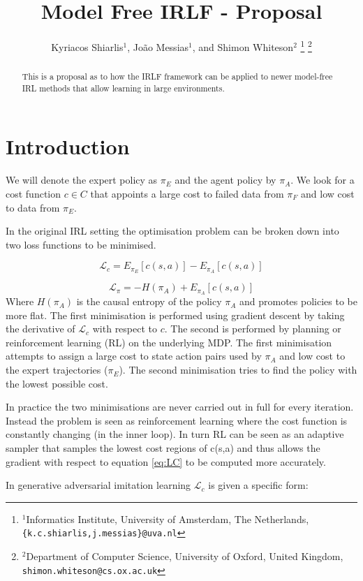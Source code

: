 \documentclass[letterpaper, 10 pt, conference]{ieeeconf}
\title{\LARGE \bf
Model Free IRLF - Proposal
}
\author{Kyriacos Shiarlis$^{1}$, Jo\~ao Messias$^{1}$, and Shimon Whiteson$^{2}$%
\thanks{$^{1}$Informatics Institute, University of Amsterdam, The Netherlands,
         {\tt\small \{k.c.shiarlis,j.messias\}@uva.nl}}%
\thanks{$^{2}$Department of Computer Science, University of Oxford, United Kingdom,
         {\tt\small shimon.whiteson@cs.ox.ac.uk}}%
}
\begin{document}
\maketitle

\thispagestyle{empty}
\pagestyle{empty}


\begin{abstract}
This is a proposal as to how the IRLF framework can be applied to newer model-free IRL methods that allow learning in large environments.
\end{abstract}

\section{Introduction}
We will denote the expert policy as $\pi_E$ and the agent policy by $\pi_A$. We look for a cost function $c \in C$ that appoints a large cost to failed data from $\pi_F$ and low cost to data from $\pi_E$. 

In the original IRL setting the optimisation problem can be broken down into two loss functions to be minimised.

\[
\mathcal{L}_c = E_{\pi_E}[c(s,a)] - E_{\pi_A}[c(s,a)] \label{eq:LC}
\]

\[
\mathcal{L}_{\pi} = -H(\pi_A) + E_{\pi_A}[c(s,a)] \label{eq:LP}
\]
Where $H(\pi_A)$ is the causal entropy of the policy $\pi_A$ and promotes policies to be more flat. 
The first minimisation is performed using gradient descent by taking the derivative of $\mathcal{L}_c$ with respect to $c$. The second is performed by planning or reinforcement learning (RL) on the underlying MDP. The first minimisation attempts to assign a large cost to state action pairs used by $\pi_A$ and low cost to the expert trajectories ($\pi_E$). The second minimisation tries to find the policy with the lowest possible cost. 

In practice the two minimisations are never carried out in full for every iteration. Instead the problem is seen as reinforcement learning where the cost function is constantly changing (in the inner loop). In turn RL can be seen as an adaptive sampler that samples the lowest cost regions of c(s,a) and thus allows the gradient with respect to equation \ref{eq:LC}  to be computed more accurately. 

In generative adversarial imitation learning $\mathcal{L}_c$  is given a specific form:
\end{document}
